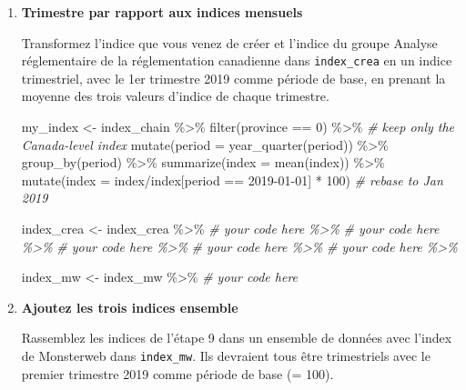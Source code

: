 \documentclass[
]{article}
\newenvironment{Shaded}{\begin{snugshade}}{\end{snugshade}}
\newcommand{\AttributeTok}[1]{\textcolor[rgb]{0.77,0.63,0.00}{#1}}
\newcommand{\CommentTok}[1]{\textcolor[rgb]{0.56,0.35,0.01}{\textit{#1}}}
\newcommand{\DecValTok}[1]{\textcolor[rgb]{0.00,0.00,0.81}{#1}}
\newcommand{\FunctionTok}[1]{\textcolor[rgb]{0.00,0.00,0.00}{#1}}
\newcommand{\NormalTok}[1]{#1}
\newcommand{\OtherTok}[1]{\textcolor[rgb]{0.56,0.35,0.01}{#1}}
\newcommand{\SpecialCharTok}[1]{\textcolor[rgb]{0.00,0.00,0.00}{#1}}
\newcommand{\StringTok}[1]{\textcolor[rgb]{0.31,0.60,0.02}{#1}}
\begin{document}
\begin{enumerate}
\def\labelenumi{\arabic{enumi}.}
\setcounter{enumi}{8}
\item
  \textbf{Trimestre par rapport aux indices mensuels}

  Transformez l'indice que vous venez de créer et l'indice du groupe Analyse réglementaire de la réglementation canadienne dans \texttt{index\_crea} en un indice trimestriel, avec le 1er trimestre 2019 comme période de base, en prenant la moyenne des trois valeurs d'indice de chaque trimestre.

\begin{Shaded}
\begin{Highlighting}[]
\NormalTok{my\_index }\OtherTok{\textless{}{-}}\NormalTok{ index\_chain }\SpecialCharTok{\%\textgreater{}\%}
  \FunctionTok{filter}\NormalTok{(province }\SpecialCharTok{==} \StringTok{\textquotesingle{}0\textquotesingle{}}\NormalTok{) }\SpecialCharTok{\%\textgreater{}\%} \CommentTok{\# keep only the Canada{-}level index}
  \FunctionTok{mutate}\NormalTok{(}\AttributeTok{period =} \FunctionTok{year\_quarter}\NormalTok{(period)) }\SpecialCharTok{\%\textgreater{}\%}
  \FunctionTok{group\_by}\NormalTok{(period) }\SpecialCharTok{\%\textgreater{}\%}
  \FunctionTok{summarize}\NormalTok{(}\AttributeTok{index =} \FunctionTok{mean}\NormalTok{(index)) }\SpecialCharTok{\%\textgreater{}\%}
  \FunctionTok{mutate}\NormalTok{(}\AttributeTok{index =}\NormalTok{ index}\SpecialCharTok{/}\NormalTok{index[period }\SpecialCharTok{==} \StringTok{\textquotesingle{}2019{-}01{-}01\textquotesingle{}}\NormalTok{] }\SpecialCharTok{*} \DecValTok{100}\NormalTok{) }\CommentTok{\# rebase to Jan 2019}

\NormalTok{index\_crea }\OtherTok{\textless{}{-}}\NormalTok{ index\_crea }\SpecialCharTok{\%\textgreater{}\%}
  \CommentTok{\# your code here \%\textgreater{}\%}
  \CommentTok{\# your code here \%\textgreater{}\%}
  \CommentTok{\# your code here \%\textgreater{}\%}
  \CommentTok{\# your code here \%\textgreater{}\%}
  \CommentTok{\# your code here \%\textgreater{}\%}

\NormalTok{index\_mw }\OtherTok{\textless{}{-}}\NormalTok{ index\_mw }\SpecialCharTok{\%\textgreater{}\%}
  \CommentTok{\# your code here}
\end{Highlighting}
\end{Shaded}
\item
  \textbf{Ajoutez les trois indices ensemble}

  Rassemblez les indices de l'étape 9 dans un ensemble de données avec l'index de Monsterweb dans \texttt{index\_mw}. Ils devraient tous être trimestriels avec le premier trimestre 2019 comme période de base (= 100).
\end{enumerate}
\end{document}
